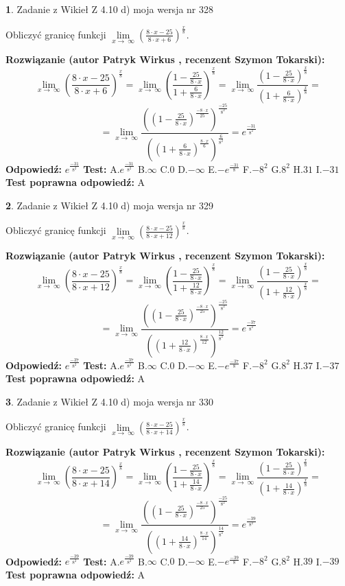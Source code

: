 \documentclass[12pt, a4paper]{article}
\theoremstyle{definition} %
\newtheorem{zad}{}
\newcommand{\zadStart}[1]{\begin{zad}#1\newline}
\newcommand{\zadStop}{\end{zad}}
\newcommand{\rozwStart}[2]{\noindent \textbf{Rozwiązanie (autor #1 , recenzent #2): }\newline}
\newcommand{\rozwStop}{\newline}
\newcommand{\odpStart}{\noindent \textbf{Odpowiedź:}\newline}
\newcommand{\odpStop}{\newline}
\newcommand{\testStart}{\noindent \textbf{Test:}\newline}
\newcommand{\testStop}{\newline}
\newcommand{\kluczStart}{\noindent \textbf{Test poprawna odpowiedź:}\newline}
\newcommand{\kluczStop}{\newline}
\begin{document}
\zadStart{Zadanie z Wikieł Z 4.10 d) moja wersja nr 328}


Obliczyć granicę funkcji  $\lim\limits_{x\to\ \infty}(\frac{8\cdot x-25}{8\cdot x+6})^{\frac{x}{8}}$.
\zadStop
\rozwStart{Patryk Wirkus}{Szymon Tokarski}
$$\lim\limits_{x\to\ \infty}(\frac{8\cdot x-25}{8\cdot x+6})^{\frac{x}{8}} = \lim\limits_{x\to\ \infty}(\frac{1-\frac{25}{8\cdot x}}{1+\frac{6}{8\cdot x}})^{\frac{x}{8}}=\lim\limits_{x\to\ \infty}\frac{(1-\frac{25}{8\cdot x})^{\frac{x}{8}}}{(1+\frac{6}{8\cdot x})^{\frac{x}{8}}}=$$
$$=\lim\limits_{x\to\ \infty}\frac{((1-\frac{25}{8\cdot x})^{\frac{-8\cdot x}{25}})^{\frac{-25}{8^{2}}}}{((1+\frac{6}{8\cdot x})^{\frac{8\cdot x}{6}})^{\frac{6}{8^{2}}}}=e^{\frac{-31}{8^{2}}}$$
\rozwStop
\odpStart
$e^{\frac{-31}{8^{2}}}$
\odpStop
\testStart
A.$e^{\frac{-31}{8^{2}}}$ B.$\infty$ C.$0$ D.$-\infty$ E.$-e^{\frac{-31}{8}}$
F.$-8^{2}$ G.$8^{2}$
H.$31$
I.$-31$
\testStop
\kluczStart
A
\kluczStop



\zadStart{Zadanie z Wikieł Z 4.10 d) moja wersja nr 329}


Obliczyć granicę funkcji  $\lim\limits_{x\to\ \infty}(\frac{8\cdot x-25}{8\cdot x+12})^{\frac{x}{8}}$.
\zadStop
\rozwStart{Patryk Wirkus}{Szymon Tokarski}
$$\lim\limits_{x\to\ \infty}(\frac{8\cdot x-25}{8\cdot x+12})^{\frac{x}{8}} = \lim\limits_{x\to\ \infty}(\frac{1-\frac{25}{8\cdot x}}{1+\frac{12}{8\cdot x}})^{\frac{x}{8}}=\lim\limits_{x\to\ \infty}\frac{(1-\frac{25}{8\cdot x})^{\frac{x}{8}}}{(1+\frac{12}{8\cdot x})^{\frac{x}{8}}}=$$
$$=\lim\limits_{x\to\ \infty}\frac{((1-\frac{25}{8\cdot x})^{\frac{-8\cdot x}{25}})^{\frac{-25}{8^{2}}}}{((1+\frac{12}{8\cdot x})^{\frac{8\cdot x}{12}})^{\frac{12}{8^{2}}}}=e^{\frac{-37}{8^{2}}}$$
\rozwStop
\odpStart
$e^{\frac{-37}{8^{2}}}$
\odpStop
\testStart
A.$e^{\frac{-37}{8^{2}}}$ B.$\infty$ C.$0$ D.$-\infty$ E.$-e^{\frac{-37}{8}}$
F.$-8^{2}$ G.$8^{2}$
H.$37$
I.$-37$
\testStop
\kluczStart
A
\kluczStop



\zadStart{Zadanie z Wikieł Z 4.10 d) moja wersja nr 330}


Obliczyć granicę funkcji  $\lim\limits_{x\to\ \infty}(\frac{8\cdot x-25}{8\cdot x+14})^{\frac{x}{8}}$.
\zadStop
\rozwStart{Patryk Wirkus}{Szymon Tokarski}
$$\lim\limits_{x\to\ \infty}(\frac{8\cdot x-25}{8\cdot x+14})^{\frac{x}{8}} = \lim\limits_{x\to\ \infty}(\frac{1-\frac{25}{8\cdot x}}{1+\frac{14}{8\cdot x}})^{\frac{x}{8}}=\lim\limits_{x\to\ \infty}\frac{(1-\frac{25}{8\cdot x})^{\frac{x}{8}}}{(1+\frac{14}{8\cdot x})^{\frac{x}{8}}}=$$
$$=\lim\limits_{x\to\ \infty}\frac{((1-\frac{25}{8\cdot x})^{\frac{-8\cdot x}{25}})^{\frac{-25}{8^{2}}}}{((1+\frac{14}{8\cdot x})^{\frac{8\cdot x}{14}})^{\frac{14}{8^{2}}}}=e^{\frac{-39}{8^{2}}}$$
\rozwStop
\odpStart
$e^{\frac{-39}{8^{2}}}$
\odpStop
\testStart
A.$e^{\frac{-39}{8^{2}}}$ B.$\infty$ C.$0$ D.$-\infty$ E.$-e^{\frac{-39}{8}}$
F.$-8^{2}$ G.$8^{2}$
H.$39$
I.$-39$
\testStop
\kluczStart
A
\kluczStop
\end{document}
